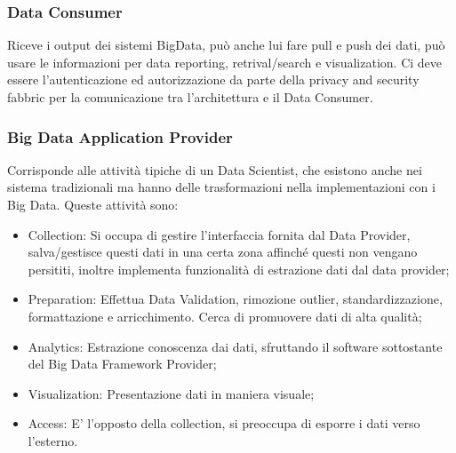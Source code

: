 \documentclass[11pt, twocolumn]{article}
\newenvironment{myitemize}
{ \begin{itemize}[topsep=0ex]
		\setlength{\itemsep}{0pt}
		\setlength{\parskip}{0pt}
		\setlength{\parsep}{0pt}     }
	{ \end{itemize}                  }
\begin{document}
\subsubsection{Data Consumer}
Riceve i output dei sistemi BigData, può anche lui fare pull e push dei dati, può usare le informazioni per data reporting, retrival/search e visualization. Ci deve essere l'autenticazione ed autorizzazione da parte della privacy and security fabbric per la comunicazione tra l'architettura e il Data Consumer.

\subsubsection{Big Data Application Provider}
Corrisponde alle attività tipiche di un Data Scientist, che esistono anche nei sistema tradizionali ma hanno delle trasformazioni nella implementazioni con i Big Data. Queste attività sono:
\begin{myitemize}
	\item Collection: Si occupa di gestire l'interfaccia fornita dal Data Provider, salva/gestisce questi dati in una certa zona affinché questi non vengano persititi, inoltre implementa funzionalità di estrazione dati dal data provider;
	\item Preparation: Effettua Data Validation, rimozione outlier, standardizzazione, formattazione e arricchimento. 
	Cerca di promuovere dati di alta qualità;
	\item Analytics: Estrazione conoscenza dai dati, sfruttando il software sottostante del Big Data Framework Provider;
	\item Visualization: Presentazione dati in maniera visuale;
	\item Access: E' l'opposto della collection, si preoccupa di esporre i dati verso l'esterno. 
\end{myitemize}
\end{document}
